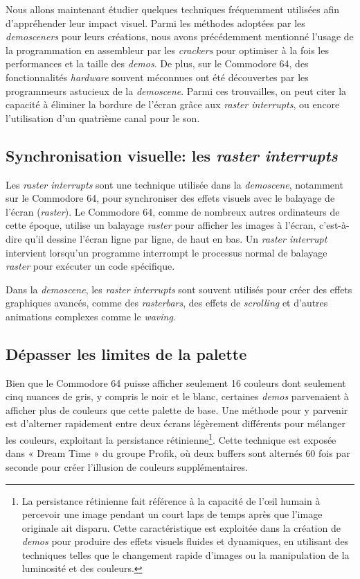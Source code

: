 Nous allons maintenant étudier quelques techniques fréquemment utilisées afin d'appréhender leur impact visuel. Parmi les méthodes adoptées par les \textit{demosceners} pour leurs créations, nous avons précédemment mentionné l'usage de la programmation en assembleur par les \textit{crackers} pour optimiser à la fois les performances et la taille des \textit{demos}. De plus, sur le Commodore 64, des fonctionnalités \textit{hardware} souvent méconnues ont été découvertes par les programmeurs astucieux de la \textit{demoscene}. Parmi ces trouvailles, on peut citer la capacité à éliminer la bordure de l'écran grâce aux \textit{raster interrupts}, ou encore l'utilisation d'un quatrième canal pour le son.

\subsection*{Synchronisation visuelle: les \textit{raster interrupts}}

Les \textit{raster interrupts} sont une technique utilisée dans la \textit{demoscene}, notamment sur le Commodore 64, pour synchroniser des effets visuels avec le balayage de l'écran (\textit{raster}). Le Commodore 64, comme de nombreux autres ordinateurs de cette époque, utilise un balayage \textit{raster} pour afficher les images à l'écran, c'est-à-dire qu'il dessine l'écran ligne par ligne, de haut en bas. Un \textit{raster interrupt} intervient lorsqu'un programme interrompt le processus normal de balayage \textit{raster} pour exécuter un code spécifique.

Dans la \textit{demoscene}, les \textit{raster interrupts} sont souvent utilisés pour créer des effets graphiques avancés, comme des \textit{rasterbars}, des effets de \textit{scrolling} et d'autres animations complexes comme le \textit{waving}.

\subsection*{Dépasser les limites de la palette}
Bien que le Commodore 64 puisse afficher seulement 16 couleurs dont seulement cinq nuances de gris, y compris le noir et le blanc, certaines \textit{demos} parvenaient à afficher plus de couleurs que cette palette de base. Une méthode pour y parvenir est d'alterner rapidement entre deux écrans légèrement différents pour mélanger les couleurs, exploitant la persistance rétinienne\footnote{La persistance rétinienne fait référence à la capacité de l'œil humain à percevoir une image pendant un court laps de temps après que l'image originale ait disparu. Cette caractéristique est exploitée dans la création de \textit{demos} pour produire des effets visuels fluides et dynamiques, en utilisant des techniques telles que le changement rapide d'images ou la manipulation de la luminosité et des couleurs.}. Cette technique est exposée dans « Dream Time » du groupe Profik, où deux buffers sont alternés 60 fois par seconde pour créer l'illusion de couleurs supplémentaires.

